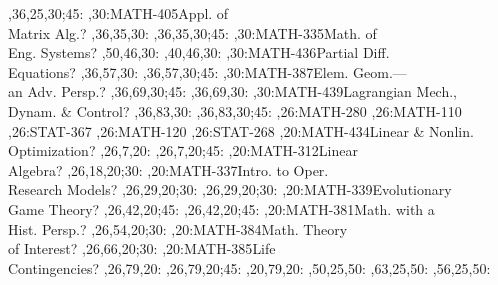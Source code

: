 \documentclass{article}
\begin{document}
\begin{chart}
  ,36,25,30;45:
,30:{MATH-405}{Appl. of\\Matrix Alg.}{?}
  ,36,35,30:
  ,36,35,30;45:
,30:{MATH-335}{Math. of\\Eng. Systems}{?}
  ,50,46,30:
  ,40,46,30:
,30:{MATH-436}{Partial Diff.\\Equations}{?}
  ,36,57,30:
  ,36,57,30;45:
,30:{MATH-387}{Elem. Geom.---\\an Adv. Persp.}{?}
  ,36,69,30;45:
  ,36,69,30:
,30:{MATH-439}{Lagrangian Mech.,\\Dynam. \& Control}{?}
  ,36,83,30:
  ,36,83,30;45:
,26:{MATH-280}
,26:{MATH-110}
,26:{STAT-367}
,26:{MATH-120}
,26:{STAT-268}
,20:{MATH-434}{Linear \& Nonlin.\\Optimization}{?}
  ,26,7,20:
  ,26,7,20;45:
,20:{MATH-312}{Linear\\Algebra}{?}
  ,26,18,20;30:
,20:{MATH-337}{Intro. to Oper.\\Research Models}{?}
  ,26,29,20;30:
  ,26,29,20;30:
,20:{MATH-339}{Evolutionary\\Game Theory}{?}
  ,26,42,20;45:
  ,26,42,20;45:
,20:{MATH-381}{Math. with a\\Hist. Persp.}{?}
  ,26,54,20;30:
,20:{MATH-384}{Math. Theory\\of Interest}{?}
  ,26,66,20;30:
,20:{MATH-385}{Life\\Contingencies}{?}
  ,26,79,20:
  ,26,79,20;45:
  ,20,79,20:
  ,50,25,50:
  ,63,25,50:
  ,56,25,50:
\end{chart}
\end{document}
